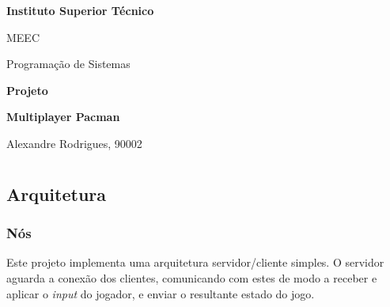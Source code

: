 \documentclass[a4paper]{report}
\begin{document}
\begin{titlepage}
    \begin{center}
        \vspace*{3cm}
 
        \LARGE
        \textbf{Instituto Superior Técnico}
        \vskip 0.4cm
 
        \Large{MEEC}
        \vskip 0.2cm

        \Large{Programação de Sistemas}
        \vskip 3cm
        

 
        \Huge{\textbf{Projeto}}
        \vskip 0.5cm

        \huge{\textbf{Multiplayer Pacman}}
        \vskip 0.5cm

        \vfill
 
        \large
        \vspace{0.3cm}
        Alexandre Rodrigues, 90002\\
        \vspace{1cm}
    \end{center}
\end{titlepage}

\tableofcontents

\setcounter{chapter}{1}
\chapter*{}
    \section{Arquitetura}
        \subsection{Nós}
            \par Este projeto implementa uma arquitetura servidor/cliente simples. O servidor aguarda a conexão dos clientes, comunicando com estes de modo a receber e aplicar o \textit{input} do jogador, e enviar o resultante estado do jogo.
\end{document}
